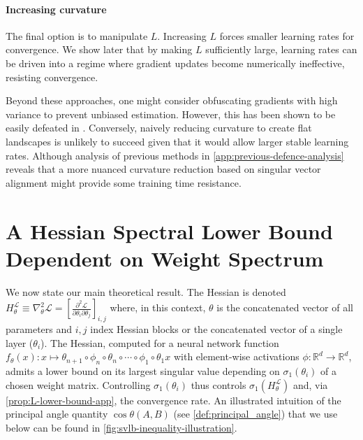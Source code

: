 \documentclass{article}
\newcommand{\prinangle}{\cos\theta}
\theoremstyle{plain}
\theoremstyle{definition}
\theoremstyle{remark}
\begin{document}
\paragraph{Increasing curvature} The final option is to manipulate $L$. Increasing $L$ forces smaller learning rates for convergence. We show later that by making $L$ sufficiently large, learning rates can be driven into a regime where gradient updates become numerically ineffective, resisting convergence.

Beyond these approaches, one might consider obfuscating gradients with high variance to prevent unbiased estimation. However, this has been shown to be easily defeated in \citet{athalye2018obfuscated}. Conversely, naively reducing curvature to create flat landscapes is unlikely to succeed given that it would allow larger stable learning rates. Although analysis of previous methods in \cref{app:previous-defence-analysis} reveals that a more nuanced curvature reduction based on singular vector alignment might provide some training time resistance.

\section{A Hessian Spectral Lower Bound Dependent on Weight Spectrum}
\label{sec:hessian_lower_bound}
We now state our main theoretical result. The Hessian is denoted $H^{\mathcal{L}}_{\theta} \equiv \nabla^2_{\theta}\mathcal{L}  = \left[\frac{\partial^2 \mathcal{L}}{\partial \theta_i \partial \theta_j}\right]_{i, j}$ where, in this context, $\theta$ is the concatenated vector of all parameters and $i,j$ index Hessian blocks or the concatenated vector of a single layer ($\theta_i$). The Hessian, computed for a neural network function $f_\theta(x): x \mapsto  \theta_{n+1} \circ \phi_{n} \circ \theta_{n} \circ \cdots \circ \phi_1 \circ \theta_1x$ with element-wise activations $\phi : \mathbb{R}^d \to \mathbb{R}^d$, admits a lower bound on its largest singular value depending on $\sigma_1(\theta_i)$ of a chosen weight matrix. Controlling $\sigma_1(\theta_i)$ thus controls $\sigma_1(H^{\mathcal{L}}_{\theta})$ and, via \cref{prop:L-lower-bound-app}, the convergence rate. An illustrated intuition of the principal angle quantity $\prinangle(A,B)$ (see \cref{def:principal_angle}) that we use below can be found in \cref{fig:svlb-inequality-illustration}. 
\end{document}
